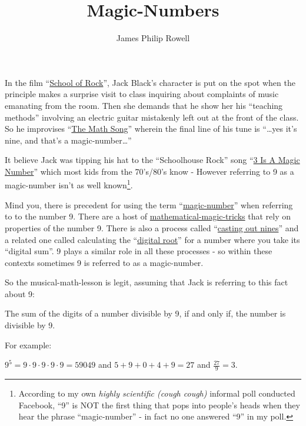 \documentclass{article}
\title{Magic-Numbers}
\author{James Philip Rowell}
\newenvironment{jprIn}{\begin{adjustwidth}{2em}{}}{\end{adjustwidth}}
\begin{document}
\maketitle

In the film ``\href{https://en.wikipedia.org/wiki/School_of_Rock}{School
of Rock}'', Jack Black's character is put on the spot when
the principle makes a surprise visit to class
inquiring about complaints of music emanating from the room. Then she demands that he show
her his ``teaching methods'' involving an electric guitar mistakenly
left out at the front of the class.
So he improvises ``\href{https://www.youtube.com/watch?v=aa8U0nL-KXg}{The
Math Song}'' wherein the final line of his
tune is ``\dots{}yes it's nine, and that's a magic-number\dots{}''

It believe Jack was tipping his hat
to the ``Schoolhouse Rock'' song ``\href{https://youtu.be/aU4pyiB-kq0}{3
Is A Magic Number}''
which most kids from the 70's/80's know -
However referring to 9 as a magic-number isn't
as well known\footnote{According to my own \emph{highly scientific (cough cough)}
informal poll conducted Facebook, %
``9'' is NOT the first thing that pops into people's heads when they
hear the phrase ``magic-number'' - in fact no one answered ``9'' in my poll.}.

Mind you, there is precedent
for using the term ``\href{http://mathworld.wolfram.com/MagicNumber.html}{magic-number}''
when referring to to the number 9.
There are a host of
\href{http://mathematics-in-europe.eu/?p=144}{mathematical-magic-tricks}
that rely on properties of the number 9.
There is also a process called
``\href{https://en.wikipedia.org/wiki/Casting_out_nines}{casting out nines}'' and a related one 
called calculating the
``\href{http://mathworld.wolfram.com/DigitalRoot.html}{digital root}''
for a number where you take its ``digital sum''. 9 plays a similar role
in all these processes - so within these contexts sometimes 9
is referred to as a magic-number.

So the musical-math-lesson is legit, assuming that Jack is referring to this fact about 9:
\begin{center}
The sum of the digits of a number divisible by 9,
\break
if and only if,
\break
the number
is divisible by 9.
\end{center}

For example:
\begin{jprIn}
$9^5=9\cdot{}9\cdot{}9\cdot{}9\cdot{}9=59049$
\quad and \quad $5+9+0+4+9=27$ \quad and \quad $\frac{27}{9} = 3$.
\end{jprIn}
\end{document}
